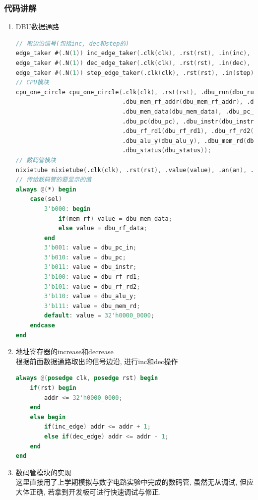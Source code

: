 \documentclass[UTF8]{article}
\begin{document}
\subsubsection{代码讲解}
\begin{enumerate}
	\item DBU数据通路
	\begin{lstlisting}[language=verilog]
// 取边沿信号(包括inc, dec和step的)
edge_taker #(.N(1)) inc_edge_taker(.clk(clk), .rst(rst), .in(inc), .out(inc_edge));
edge_taker #(.N(1)) dec_edge_taker(.clk(clk), .rst(rst), .in(dec), .out(dec_edge));
edge_taker #(.N(1)) step_edge_taker(.clk(clk), .rst(rst), .in(step), .out(dbu_run));
// CPU模块
cpu_one_circle cpu_one_circle(.clk(clk), .rst(rst), .dbu_run(dbu_run | succ),
                              .dbu_mem_rf_addr(dbu_mem_rf_addr), .dbu_rf_data(dbu_rf_data),
                              .dbu_mem_data(dbu_mem_data), .dbu_pc_in(dbu_pc_in),
                              .dbu_pc(dbu_pc), .dbu_instr(dbu_instr),
                              .dbu_rf_rd1(dbu_rf_rd1), .dbu_rf_rd2(dbu_rf_rd2),
                              .dbu_alu_y(dbu_alu_y), .dbu_mem_rd(dbu_mem_rd),
                              .dbu_status(dbu_status));
// 数码管模块
nixietube nixietube(.clk(clk), .rst(rst), .value(value), .an(an), .seg(seg));
// 传给数码管的要显示的值
always @(*) begin
    case(sel)
        3'b000: begin
            if(mem_rf) value = dbu_mem_data;
            else value = dbu_rf_data;
        end
        3'b001: value = dbu_pc_in;
        3'b010: value = dbu_pc;
        3'b011: value = dbu_instr;
        3'b100: value = dbu_rf_rd1;
        3'b101: value = dbu_rf_rd2;
        3'b110: value = dbu_alu_y;
        3'b111: value = dbu_mem_rd;
        default: value = 32'h0000_0000;
    endcase
end
	\end{lstlisting}
	
	\item 地址寄存器的increase和decrease\\
	根据前面数据通路取出的信号边沿, 进行inc和dec操作
	\begin{lstlisting}[language=verilog]
always @(posedge clk, posedge rst) begin
    if(rst) begin
        addr <= 32'h0000_0000;
    end
    else begin
        if(inc_edge) addr <= addr + 1;
        else if(dec_edge) addr <= addr - 1;
    end
end
	\end{lstlisting}
	
	\item 数码管模块的实现\\
	这里直接用了上学期模拟与数字电路实验中完成的数码管, 虽然无从调试, 但应大体正确, 若拿到开发板可进行快速调试与修正.
	\begin{lstlisting}[language=verilog]


\end{lstlisting}
\end{enumerate}
\end{document}
